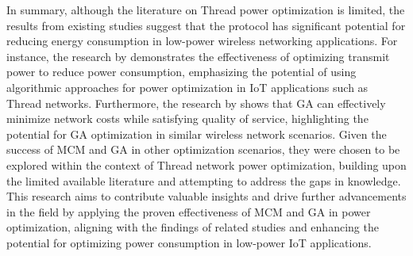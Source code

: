 In summary, although the literature on Thread power optimization is limited, the results from existing studies suggest that the protocol has significant potential for reducing energy consumption in low-power wireless networking applications. For instance, the research by \textcite{sheth2002implementation} demonstrates the effectiveness of optimizing transmit power to reduce power consumption, emphasizing the potential of using algorithmic approaches for power optimization in \gls{IoT} applications such as Thread networks. Furthermore, the research by \textcite{girgis2014solving} shows that \gls{GA} can effectively minimize network costs while satisfying quality of service, highlighting the potential for \gls{GA} optimization in similar wireless network scenarios. Given the success of \gls{MCM} and \gls{GA} in other optimization scenarios, they were chosen to be explored within the context of Thread network power optimization, building upon the limited available literature and attempting to address the gaps in knowledge. This research aims to contribute valuable insights and drive further advancements in the field by applying the proven effectiveness of \gls{MCM} and \gls{GA} in power optimization, aligning with the findings of related studies and enhancing the potential for optimizing power consumption in low-power \gls{IoT} applications.
